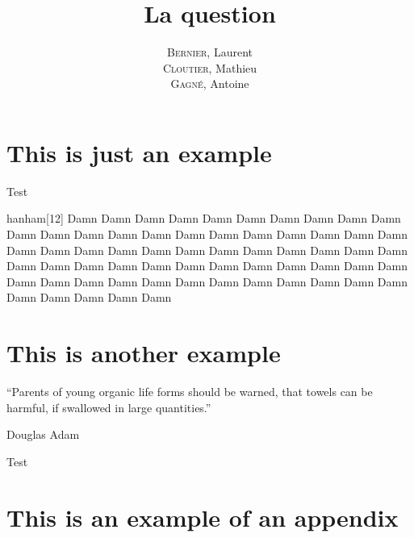 \documentclass[12pt]{GDD}
\author{%
    \textsc{Bernier}, Laurent \\%
    \textsc{Cloutier}, Mathieu \\%
    \textsc{Gagné}, Antoine%
}
\title{La question}
\begin{document}
\chapter{This is just an example}
\lipsum%
Test

\begin{quoting}{hanham}[12]
    Damn Damn Damn Damn Damn Damn Damn Damn Damn Damn Damn Damn Damn Damn Damn Damn Damn Damn Damn Damn Damn Damn Damn Damn Damn Damn Damn Damn Damn Damn Damn Damn Damn Damn Damn Damn Damn Damn Damn Damn Damn Damn Damn Damn Damn Damn Damn Damn Damn Damn Damn Damn Damn Damn Damn Damn Damn Damn Damn Damn Damn Damn Damn
\end{quoting}


\chapter{This is another example}
\epigraph{``Parents of young organic life forms should be warned, that towels can be harmful, if swallowed in large quantities.''}{Douglas Adam}
\lipsum%
Test

\printbibliography[heading=bibintoc]%

\appendix

\chapter{This is an example of an appendix}
\lipsum%
\end{document}
